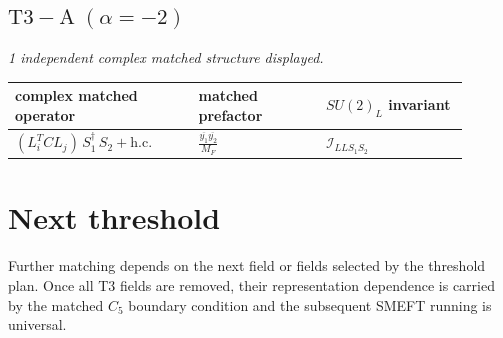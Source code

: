 \documentclass[9pt]{article}
\begin{document}
\subsection*{$ \mathrm{T3-A}\;(\alpha=-2) $}
\textit{1 independent complex matched structure displayed. }
\begin{longtable}{@{}p{0.36\linewidth}p{0.25\linewidth}p{0.29\linewidth}@{}}
\toprule
complex matched operator & matched prefactor & $SU(2)_L$ invariant \\
\midrule
$ (L_i^T C L_j)\,S_1^\dagger\,S_2+\mathrm{h.c.} $ & $ \frac{\overline{y_{1}} \overline{y_{2}}}{M_F} $ & $ \mathcal{I}_{LLS_1S_2} $ \\
\bottomrule
\end{longtable}
\section*{Next threshold}
Further matching depends on the next field or fields selected by the threshold plan.  Once all T3 fields are removed, their representation dependence is carried by the matched $C_5$ boundary condition and the subsequent SMEFT running is universal.
\end{document}
